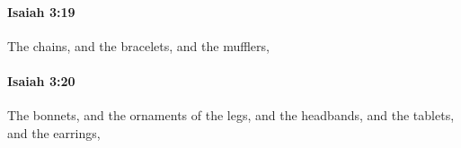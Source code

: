 		\paragraph{Isaiah 3:19} %
			\label{ISAIAH-3-19}

			The chains, and the bracelets, and the mufflers,


		\paragraph{Isaiah 3:20} %
			\label{ISAIAH-3-20}

			The bonnets, and the ornaments of the legs, and the headbands, and the tablets, and the earrings,


